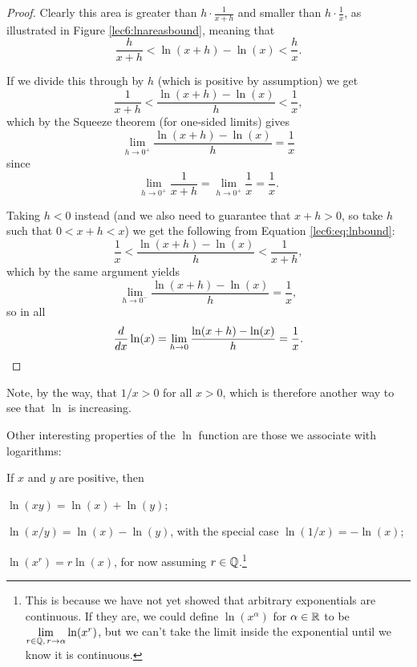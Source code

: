 \begin{proof}
	Clearly this area is greater than $h \cdot \frac{1}{x + h}$ and smaller than $h \cdot \frac{1}{x}$, as illustrated in Figure \ref{lec6:lnareasbound}, meaning that
	\begin{equation}\label{lec6:eq:lnbound}
		\frac{h}{x + h} < \ln(x + h) - \ln(x) < \frac{h}{x}.
	\end{equation}

	\noindent
	If we divide this through by $h$ (which is positive by assumption) we get
	\[
		\frac{1}{x + h} < \frac{\ln(x + h) - \ln(x)}{h} < \frac{1}{x},
	\]
	which by the Squeeze theorem (for one-sided limits) gives
	\[
		\lim_{h \to 0^+} \frac{\ln(x + h) - \ln(x)}{h} = \frac{1}{x}
	\]
	since
	\[
		\lim_{h \to 0^+} \frac{1}{x + h} = \lim_{h \to 0^+} \frac{1}{x} = \frac{1}{x}.
	\]

	\noindent
	Taking $h < 0$ instead (and we also need to guarantee that $x + h > 0$, so take $h$ such that $0 < x + h < x$) we get the following from Equation \eqref{lec6:eq:lnbound}:
	\[
		\frac{1}{x} < \frac{\ln(x + h) - \ln(x)}{h} < \frac{1}{x + h},
	\]
	which by the same argument yields
	\[
		\lim_{h \to 0^-} \frac{\ln(x + h) - \ln(x)}{h} = \frac{1}{x},
	\]
	so in all
	\[
		\frac{d}{d x} \ln(x) = \lim_{h \to 0} \frac{\ln(x + h) - \ln(x)}{h} = \frac{1}{x}. \qedhere
	\]
\end{proof}

\noindent
Note, by the way, that $1 / x > 0$ for all $x > 0$, which is therefore another way to see that $\ln$ is increasing.

Other interesting properties of the $\ln$ function are those we associate with logarithms:

\begin{theorem}
	If $x$ and $y$ are positive, then
	\begin{romanlist}
		\item $\ln(x y) = \ln(x) + \ln(y)$;
		\item $\ln(x / y) = \ln(x) - \ln(y)$, with the special case $\ln(1 / x) = - \ln(x)$;
		\item $\ln(x^r) = r \ln(x)$, for now assuming $r \in \mathbb{Q}$.\footnote{This is because we have not yet showed that arbitrary exponentials are continuous.
		If they are, we could define $\ln(x^\alpha)$ for $\alpha \in \mathbb{R}$ to be $\lim\limits_{r \in \mathbb{Q},\, r \to \alpha} \ln(x^r)$, but we can't take the limit inside the exponential until we know it is continuous.}
	\end{romanlist}
\end{theorem}

